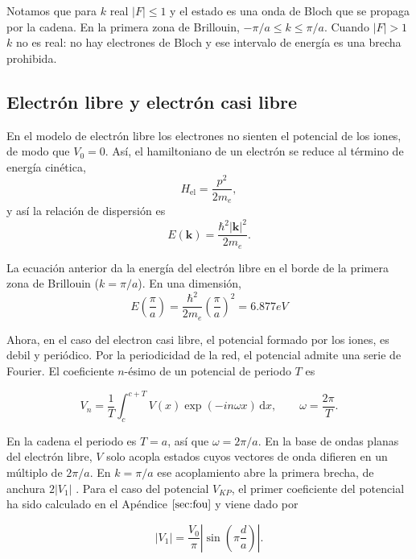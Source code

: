 \documentclass[reprint, amsmath, amssymb, aps, prb]{revtex4-2}
\begin{document}
Notamos que para $k$ real $|F|\leq 1$ y el estado es una onda de Bloch que se propaga por la cadena. En la primera zona de Brillouin, $-\pi/a\leq k\leq\pi/a$. Cuando $|F|>1$ $k$ no es real: no hay electrones de Bloch y ese intervalo de energía es una brecha prohibida. 

\subsection{Electrón libre y electrón casi libre}

En el modelo de electrón libre los electrones no sienten el potencial de los iones, de modo que $V_0=0$. Así, el hamiltoniano de un electrón se reduce al término de energía cinética,
\begin{equation}
H_{\mathrm{el}}=\frac{p^2}{2m_e},
\end{equation}
y así la relación de dispersión es
\begin{equation}
E(\mathbf{k})=\frac{\hbar^2|\mathbf{k}|^2}{2m_e}.
\label{eq:libre}
\end{equation}

La ecuación anterior da la energía del electrón libre en el borde de la primera zona de Brillouin ($k=\pi/a$). En una dimensión, 
\begin{equation}
 E \left(\frac{\pi}{a}\right)=\frac{\hbar^2}{2m_e}\left(\frac{\pi}{a}\right)^2=6.877 eV
\label{eq:eborde}
\end{equation}

Ahora, en el caso del electron casi libre, el potencial formado por los iones, es debil y periódico. Por la periodicidad de la red, el potencial admite una serie de Fourier. El coeficiente $n$-ésimo de un potencial de periodo $T$ es

\begin{equation}
V_n=\frac{1}{T}\int_{c}^{c+T}V(x)\exp(-in\omega x)\,\mathrm{d}x,
\qquad\omega=\frac{2\pi}{T}.
\label{eq:fourier}
\end{equation}

En la cadena el periodo es $T=a$, así que $\omega=2\pi/a$. En la base de ondas planas del electrón libre, $V$ solo acopla estados cuyos vectores de onda difieren en un múltiplo de $2\pi/a$. En $k=\pi/a$ ese acoplamiento abre la primera brecha, de anchura $2|V_1|$ \cite{kittel}. Para el caso del potencial $V_{KP}$, el primer coeficiente del potencial ha sido calculado en el Apéndice $\ref{sec:fou}$ y viene dado por 

\begin{equation}
|V_1|=\frac{V_0}{\pi}\left|\sin\left(\pi\frac{d}{a}\right)\right|.
\label{eq:V1mod}
\end{equation}
\end{document}
